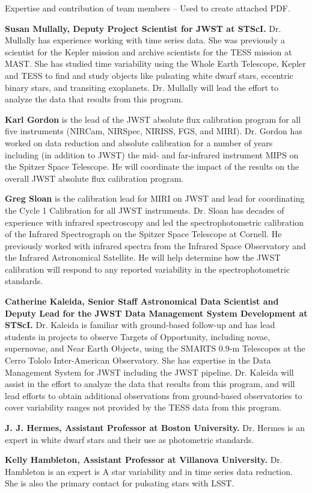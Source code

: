 Expertise and contribution of team members -- Used to create attached PDF.

\textbf{Susan Mullally, Deputy Project Scientist for JWST at STScI.} Dr. Mullally has experience working with time series data. She was previously a scientist for the Kepler mission and archive scientists for the TESS mission at MAST.  She has studied time variability using the Whole Earth Telescope, Kepler and TESS to find and study objects like pulsating white dwarf stars, eccentric binary stars, and transiting exoplanets.  Dr. Mullally will lead the effort to analyze the data that results from this program.


\textbf{Karl Gordon} is the lead of the JWST absolute flux calibration program for all five instruments (NIRCam, NIRSpec, NIRISS, FGS, and MIRI).  Dr. Gordon has worked on data reduction and absolute calibration for a number of years including (in addition to JWST) the mid- and far-infrared instrument MIPS on the Spitzer Space Telescope.  He will coordinate the impact of the results on the overall JWST absolute flux calibration program.


\textbf{Greg Sloan} is the calibration lead for MIRI on JWST and lead for coordinating the Cycle 1 Calibration for all JWST instruments.  Dr. Sloan has decades of experience with infrared spectroscopy and led the spectrophotometric calibration of the Infrared Spectrograph on the Spitzer Space Telescope at Cornell.  He previously worked with infrared spectra from the Infrared Space Observatory and the Infrared Astronomical Satellite.  He will help determine how the JWST calibration will respond to any reported variability in the spectrophotometric standards.


\textbf{Catherine Kaleida, Senior Staff Astronomical Data Scientist and Deputy Lead for the JWST Data Management System Development at  STScI.}  Dr. Kaleida is familiar with ground-based follow-up and has lead students in projects to observe Targets of Opportunity, including novae, supernovae, and Near Earth Objects, using the SMARTS 0.9-m Telescopes at the Cerro Tololo Inter-American Observatory.  She has expertise in the Data Management System for JWST including the JWST pipeline. Dr. Kaleida will assist in the effort to analyze the data that results from this program, and will lead efforts to obtain additional observations from ground-based observatories to cover variability ranges not provided by the TESS data from this program.

\textbf{J. J. Hermes, Assistant Professor at Boston University.} Dr. Hermes is an expert in white dwarf stars and their use as photometric standards.  

\textbf{Kelly Hambleton, Assistant Professor at Villanova University.} Dr. Hambleton is an expert is A star variability and in time series data reduction. She is also the primary contact for pulsating stars with LSST.

